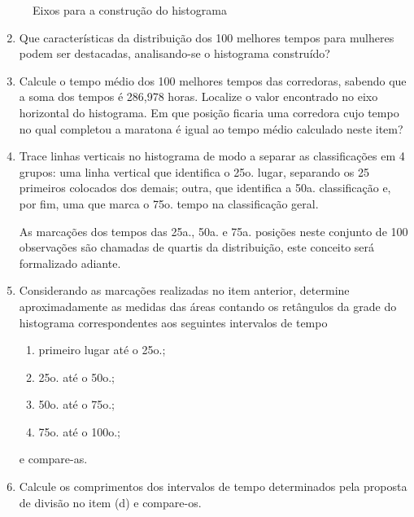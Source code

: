 \begin{figure}[H]
\centering
\capstart

\noindent{}
\caption{Eixos para a construção do histograma}\label{\detokenize{PE104-0:hist-maratona-mulheres}}\label{\detokenize{PE104-0:id15}}\end{figure}
\begin{enumerate}
\setcounter{enumi}{1}
\item {} 
Que características da distribuição dos 100 melhores tempos para mulheres podem ser destacadas, analisando-se o histograma construído?

\item {} 
Calcule o tempo médio dos 100 melhores tempos das corredoras, sabendo que a soma dos tempos é 286,978 horas. Localize o valor encontrado no eixo horizontal do histograma. Em que posição ficaria uma corredora cujo tempo no qual completou a maratona é igual ao tempo médio calculado neste item?

\item {} 
Trace linhas verticais no histograma de modo a separar as classificações em 4 grupos: uma linha vertical que identifica o 25o. lugar, separando os 25 primeiros colocados dos demais; outra, que identifica a 50a. classificação e, por fim, uma que marca o 75o. tempo na classificação geral.

As marcações dos tempos das 25a., 50a. e 75a. posições neste conjunto de 100 observações são chamadas de quartis da distribuição, este conceito será formalizado adiante.

\item {} 
Considerando as marcações realizadas no item anterior, determine aproximadamente as medidas das áreas contando os retângulos da grade do histograma correspondentes aos seguintes intervalos de tempo
\begin{enumerate}
\item {} 
primeiro lugar até o 25o.;

\item {} 
25o. até o 50o.;

\item {} 
50o. até o 75o.;

\item {} 
75o. até o 100o.;

\end{enumerate}

e compare-as.

\item {} 
Calcule os comprimentos dos intervalos de tempo determinados pela proposta de divisão no item (d) e compare-os.

\end{enumerate}


